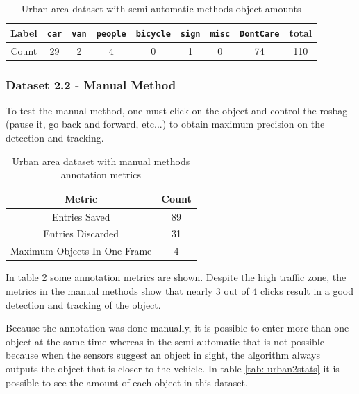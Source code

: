 \begin{table}[]
	\centering
	\caption{Urban area dataset  with semi-automatic methods object amounts}
	\label{tab: urban1stats}
	\begin{tabular}{c|c|c|c|c|c|c|c|c}
		\textbf{Label} & \texttt{car} & \texttt{van} & \texttt{people} & \texttt{bicycle} & \texttt{sign} & \texttt{misc} & \texttt{DontCare} & \textbf{total} \\ \hline
		Count          & 29           & 2            & 4               & 0                & 1             & 0             & 74                & 110           
	\end{tabular}
\end{table}


\subsubsection{Dataset 2.2 - Manual Method}

To test the manual method, one must click on the object and control the rosbag (pause it, go back and forward, etc...) to obtain maximum precision on the detection and tracking. 

\begin{table}[]
	\centering
	\caption{Urban area dataset with manual methods annotation metrics}
	\label{tab: urban2metrics}
	\begin{tabular}{c|c}
		\textbf{Metric}              & \textbf{Count} \\ \hline
		Entries Saved           & 89                      \\ \hline
		Entries Discarded            & 31                      \\ \hline
		Maximum Objects In One Frame & 4                 
	\end{tabular}
\end{table}

In table \ref{tab: urban2metrics} some annotation metrics are shown. Despite the high traffic zone, the metrics in the manual methods show that nearly 3 out of 4 clicks result in a good detection and tracking of the object. 

Because the annotation was done manually, it is possible to enter more than one object at the same time whereas in the semi-automatic that is not possible because when the sensors suggest an object in sight, the algorithm always outputs the object that is closer to the vehicle. In table \ref{tab: urban2stats} it is possible to see the amount of each object in this dataset.

